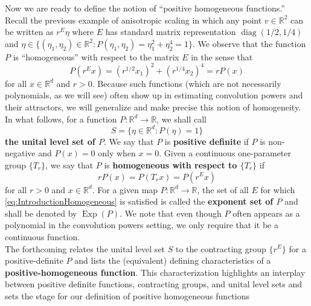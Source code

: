 \documentclass[11pt, letter]{book}
\newcommand\Exp{\operatorname{Exp}}
\newcommand\diag{\operatorname{diag}}
\newcommand{\lp}{\left(}
\newcommand{\rp}{\right)}
\begin{document}

\noindent Now we are ready to define the notion of ``positive homogeneous functions.'' Recall the previous example of anisotropic scaling in which any point $v\in \mathbb{R}^2$ can be written as $r^{E}\eta$ where $E$ has standard matrix representation $\diag(1/2,1/4)$ and $\eta \in \{ (\eta_1,\eta_2) \in \mathbb{R}^2 : P(\eta_1, \eta_2) ={\eta}_1^{2} + {\eta}_2^{4} = 1  \}$. We observe that the function $P$ is ``homogeneous'' with respect to the matrix $E$ in the sense that 
\begin{equation*}
    P(r^{E}x) =  \lp r^{1/2}{x}_1\rp ^{2} + \lp r^{1/4}{x}_2\rp ^{4} = r P(x)
\end{equation*}
for all $x\in \mathbb{R}^d$ and $r>0$. Because such functions (which are not necessarily polynomials, as we will see) often show up in estimating convolution powers and their attractors, we will generalize and make precise this notion of homogeneity. In what follows, for a function $P:\mathbb{R}^d\to\mathbb{R}$, we shall call
\begin{equation*}
    S=\{\eta\in\mathbb{R}^d:P(\eta)=1\}
\end{equation*}
\textbf{the unital level set of $P$}. We say that $P$ is \textbf{positive definite} if $P$ is non-negative and $P(x)=0$ only when $x=0$. Given a continuous one-parameter group $\{T_r\}$, we say that $P$ is \textbf{homogeneous with respect to $\{T_r\}$} if
\begin{equation}\label{eq:IntroductionHomogeneous}
    rP(x)=P(T_r x)=P(r^Ex)
\end{equation}
for all $r>0$ and $x\in\mathbb{R}^d$. For a given map $P:\mathbb{R}^d\to\mathbb{R}$, the set of all $E$ for which \eqref{eq:IntroductionHomogeneous} is satisfied is called the \textbf{exponent set of $P$} and shall be denoted by $\Exp(P)$. We note that even though $P$ often appears as a polynomial in the convolution powers setting, we only require that it be a continuous function. \\



The forthcoming relates the unital level set $S$ to the contracting group $\{r^E\}$ for a positive-definite $P$ and lists the (equivalent) defining characteristics of a \textbf{positive-homogeneous function}. This characterization highlights an interplay between positive definite functions, contracting groups, and unital level sets and sets the stage for our definition of positive homogeneous functions\\
\end{document}
